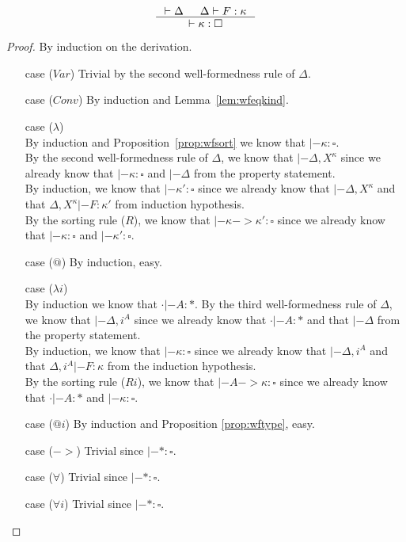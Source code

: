 \begin{proposition}
\label{prop:wfkind}
\[ \inference{ |- \Delta & \Delta |- F : \kappa}{ |- \kappa:\square }
\]
\end{proposition}
\begin{proof} By induction on the derivation.
\begin{itemize}
\item[case] ($Var$)
	Trivial by the second well-formedness rule of $\Delta$.
\item[case] ($Conv$)
	By induction and Lemma~\ref{lem:wfeqkind}.
\item[case] ($\lambda$) \\
	By induction and Proposition~\ref{prop:wfsort} we know
	that $|- \kappa:\square$.\\
	By the second well-formedness rule of $\Delta$,
	we know that $|- \Delta,X^\kappa$ since we already know
	that $|- \kappa:\square$ and $|- \Delta$ from the property statement.\\
	By induction, we know that $|- \kappa':\square$
	since we already know that $|- \Delta,X^\kappa$ and
	that $\Delta,X^\kappa|- F:\kappa'$ from induction hypothesis.\\
	By the sorting rule ($R$), we know that $|- \kappa -> \kappa':\square$
	since we already know that $|- \kappa:\square$ and $|- \kappa':\square$.
\item[case] ($@$)
	By induction, easy.
\item[case] ($\lambda i$)\\
	By induction
	we know
	that $\cdot|- A:*$.
	By the third well-formedness rule of $\Delta$,
	we know that $|- \Delta,i^A$ since we already know that $\cdot|- A:*$ and
	that $|- \Delta$ from the property statement.\\
	By induction, we know that $|- \kappa:\square$
	since we already know that $|- \Delta,i^A$ and
	that $\Delta,i^A|- F:\kappa$ from the induction hypothesis.\\
	By the sorting rule ($Ri$), we know that $|- A -> \kappa:\square$
	since we already know that $\cdot |- A:*$ and $|- \kappa:\square$.
\item[case] ($@i$)
	By induction and Proposition \ref{prop:wftype}, easy.
\item[case] ($->$)
	Trivial since $|- * : \square$.
\item[case] ($\forall$)
	Trivial since $|- * : \square$.
\item[case] ($\forall i$)
	Trivial since $|- * : \square$.\qedhere
\end{itemize}
\end{proof}


